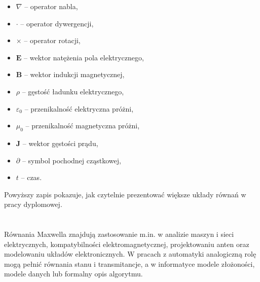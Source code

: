 \begin{itemize}
  \item \(\nabla\) -- operator nabla,
  \item \(\cdot\) -- operator dywergencji,
  \item \(\times\) -- operator rotacji,
  \item \(\mathbf{E}\) -- wektor natężenia pola elektrycznego,
  \item \(\mathbf{B}\) -- wektor indukcji magnetycznej,
  \item \(\rho\) -- gęstość ładunku elektrycznego,
  \item \(\varepsilon_0\) -- przenikalność elektryczna próżni,
  \item \(\mu_0\) -- przenikalność magnetyczna próżni,
  \item \(\mathbf{J}\) -- wektor gęstości prądu,
  \item \(\partial\) -- symbol pochodnej cząstkowej,
  \item \(t\) -- czas.
\end{itemize}

Powyższy zapis pokazuje, jak czytelnie prezentować większe układy równań w pracy dyplomowej.

\section{}

Równania Maxwella znajdują zastosowanie m.in. w analizie maszyn i sieci elektrycznych, kompatybilności elektromagnetycznej, projektowaniu anten oraz modelowaniu układów elektronicznych. W pracach z automatyki analogiczną rolę mogą pełnić równania stanu i transmitancje, a w informatyce modele złożoności, modele danych lub formalny opis algorytmu.
